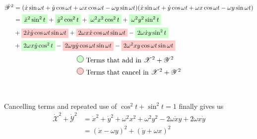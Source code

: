 \begin{align}
\begin{split}
\dot{\mathscr{Y}}^2 &= (\dot{x}\sin{\omega t} + \dot{y}\cos{\omega t} + \omega x\cos{\omega t} - \omega y\sin{\omega t})(\dot{x}\sin{\omega t} + \dot{y}\cos{\omega t} + \omega x\cos{\omega t} - \omega y\sin{\omega t}) \\
&=
\tikz[baseline]{
    \node[fill=green!20,anchor=base]
    {$\dot{x}^2\sin^2{t}$};
} +
\tikz[baseline]{
    \node[fill=green!20,anchor=base]
    {$\dot{y}^2\cos^2{t}$};
} +
\tikz[baseline]{
    \node[fill=green!20,anchor=base]
    {$\omega^2 x^2\cos^2{t}$};
} +
\tikz[baseline]{
    \node[fill=green!20,anchor=base]
    {$\omega^2 y^2\sin^2{t}$};
} \\
&+
\tikz[baseline]{
    \node[fill=red!20,anchor=base]
    {$2 \dot{x}\dot{y}\cos{\omega t}\sin{\omega t}$};
} +
\tikz[baseline]{
    \node[fill=red!20,anchor=base]
    {$2 \omega x \dot{x}\cos{\omega t}\sin{\omega t}$};
} -
\tikz[baseline]{
    \node[fill=green!20,anchor=base]
    {$2 \omega \dot{x}y\sin^2{t}$};
} \\
&+
\tikz[baseline]{
    \node[fill=green!20,anchor=base]
    {$2 \omega x \dot{y}\cos^2{t}$};
} -
\tikz[baseline]{
    \node[fill=red!20,anchor=base]
    {$2 \omega y \dot{y}\cos{\omega t}\sin{\omega t}$};
} -
\tikz[baseline]{
    \node[fill=red!20,anchor=base]
    {$2 \omega^2 x y \cos{\omega t}\sin{\omega t}$};
}
\end{split}
\end{align}
\begin{align}
\nonumber &\tikz\node [fill=green!20,draw,circle]{};\ \text{Terms that add in $\mathscr{X}^2 + \mathscr{Y}^2$} \\
\nonumber &\tikz\node [fill=red!20,draw,circle]{};\ \text{Terms that cancel in $\mathscr{X}^2 + \mathscr{Y}^2$} \\[1cm]
\end{align}
Cancelling terms and repeated use of $\cos^2{t} + \sin^2{t} = 1$ finally gives us
\begin{align}
\nonumber \dot{\mathscr{X}}^2 + \dot{\mathscr{Y}}^2 &= \dot{x}^2 + \dot{y}^2 + \omega^2 x^2 + \omega^2 y^2 - 2 \omega \dot{x} y + 2 \omega x \dot{y} \\[0.2cm]
&= (\dot{x}-\omega y)^2 + (\dot{y}+\omega x)^2
\end{align}
